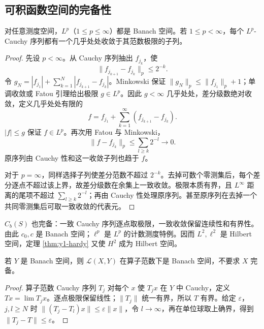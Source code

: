 \subsection{可积函数空间的完备性}
\begin{theorem}\label{thm:y1-Lp-complete}
对任意测度空间，$L^p$（$1\le p\le\infty$）都是 Banach 空间。若 $1\le p<\infty$，每个 $L^p$-Cauchy 序列都有一个几乎处处收敛于其范数极限的子列。
\end{theorem}
\begin{proof}
先设 $p<\infty$。从 Cauchy 序列抽出 $f_{j_k}$，使
\[
 \|f_{j_{k+1}}-f_{j_k}\|_p\le2^{-k}.
\]
令 $g_N=|f_{j_1}|+\sum_{k=1}^N|f_{j_{k+1}}-f_{j_k}|$。Minkowski 保证 $\|g_N\|_p\le\|f_{j_1}\|_p+1$；单调收敛或 Fatou 引理给出极限 $g\in L^p$。因此 $g<\infty$ 几乎处处，差分级数绝对收敛，定义几乎处处有限的
\[
 f=f_{j_1}+\sum_{k=1}^\infty(f_{j_{k+1}}-f_{j_k}).
\]
$|f|\le g$ 保证 $f\in L^p$。再次用 Fatou 与 Minkowski，
\[
 \|f-f_{j_k}\|_p\le\sum_{l\ge k}2^{-l}\longrightarrow0.
\]
原序列由 Cauchy 性和这一收敛子列也趋于 $f$。

对于 $p=\infty$，同样选择子列使差分范数不超过 $2^{-k}$。去掉可数个零测集后，每个差分逐点不超过该上界，故差分级数在余集上一致收敛。极限本质有界，且 $L^\infty$ 距离的尾项不超过 $\sum_{l\ge k}2^{-l}$；再由 Cauchy 性处理原序列。甚至原序列在去掉一个共同零测集后可取一致收敛的代表元。
\end{proof}
$C_b(S)$ 也完备：一致 Cauchy 序列逐点取极限，一致收敛保留连续性和有界性。由此 $c_0,c$ 是 Banach 空间；$\ell^p$ 是 $L^p$ 的计数测度特例。因而 $L^2,\ell^2$ 是 Hilbert 空间，定理 \ref{thm:y1-hardy} 又使 $H^2$ 成为 Hilbert 空间。

\begin{proposition}[补充：有界算子空间的完备性]
若 $Y$ 是 Banach 空间，则 $\mathcal L(X,Y)$ 在算子范数下是 Banach 空间，不要求 $X$ 完备。
\end{proposition}
\begin{proof}
算子范数 Cauchy 序列 $T_j$ 对每个 $x$ 使 $T_jx$ 在 $Y$ 中 Cauchy，定义 $Tx=\lim T_jx$。逐点极限保留线性；$\|T_j\|$ 统一有界，所以 $T$ 有界。给定 $\varepsilon$，$j,l\ge N$ 时 $\|(T_j-T_l)x\|\le\varepsilon\|x\|$，令 $l\to\infty$，再在单位球取上确界，得到 $\|T_j-T\|\le\varepsilon$。
\end{proof}

